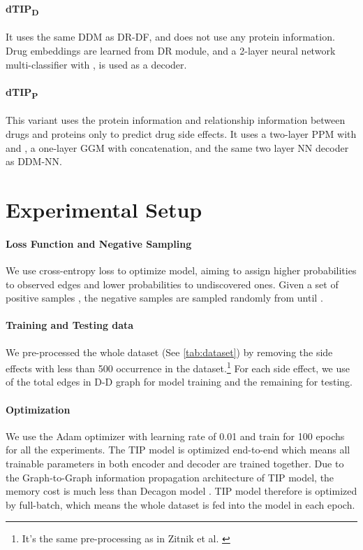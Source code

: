 \documentclass{article}
\begin{document}
\paragraph{dTIP\textsubscript{D}} It uses the same DDM as DR-DF, and does not use any protein information. Drug embeddings are learned from DR module, and a 2-layer  neural network multi-classifier with ,  is used as a decoder.

\paragraph{dTIP\textsubscript{P}} This variant uses the protein information and relationship information between drugs and proteins only to predict drug side effects. It uses a two-layer PPM with  and , a one-layer GGM  with concatenation, and the same two layer NN decoder as DDM-NN.

\section{Experimental Setup}

\paragraph{Loss Function and Negative Sampling} We use cross-entropy loss to optimize model, aiming to assign higher probabilities to observed edges and lower probabilities to undiscovered ones. Given a set of positive samples  , the negative samples  are sampled randomly from  until  \cite{gcn}.

\paragraph{Training and Testing data} We pre-processed the whole dataset (See \ref{tab:dataset}) by removing the side effects with less than 500 occurrence in the dataset.\footnote{It's the same pre-processing as in Zitnik et al. \cite{decagon}} For each side effect, we use  of the total edges in D-D graph for model training and the remaining  for testing.

\paragraph{Optimization} We use the Adam optimizer \cite{adam} with learning rate of 0.01 and train for 100 epochs for all the experiments. The TIP model is optimized end-to-end which means all trainable parameters in both encoder and decoder are trained together. Due to the Graph-to-Graph information propagation architecture of TIP model, the memory cost is much less than Decagon model \cite{decagon}. TIP model therefore is optimized by full-batch, which means the whole dataset is fed into the model in each epoch.
\end{document}
